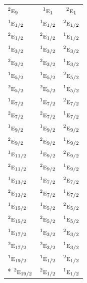 \documentclass[10pt,a4paper]{article}
\numberwithin{equation}{section}
\newcommand{\irr}[1]{\text{\normalfont\scshape #1}}
\newcommand{\conjpair}[1]{{}^{#1}}
\begin{document}
{\begin{longtable}{@{}lcc@{}}
$\conjpair{2}\irr{e}_{9}$ & $\conjpair{1}\irr{e}_{1}$ & $\conjpair{2}\irr{e}_{1}$\\
$\conjpair{1}\irr{e}_{1/2}$ & $\conjpair{1}\irr{e}_{1/2}$ & $\conjpair{2}\irr{e}_{1/2}$\\
$\conjpair{2}\irr{e}_{1/2}$ & $\conjpair{2}\irr{e}_{1/2}$ & $\conjpair{1}\irr{e}_{1/2}$\\
$\conjpair{1}\irr{e}_{3/2}$ & $\conjpair{1}\irr{e}_{3/2}$ & $\conjpair{2}\irr{e}_{3/2}$\\
$\conjpair{2}\irr{e}_{3/2}$ & $\conjpair{2}\irr{e}_{3/2}$ & $\conjpair{1}\irr{e}_{3/2}$\\
$\conjpair{1}\irr{e}_{5/2}$ & $\conjpair{1}\irr{e}_{5/2}$ & $\conjpair{2}\irr{e}_{5/2}$\\
$\conjpair{2}\irr{e}_{5/2}$ & $\conjpair{2}\irr{e}_{5/2}$ & $\conjpair{1}\irr{e}_{5/2}$\\
$\conjpair{1}\irr{e}_{7/2}$ & $\conjpair{1}\irr{e}_{7/2}$ & $\conjpair{2}\irr{e}_{7/2}$\\
$\conjpair{2}\irr{e}_{7/2}$ & $\conjpair{2}\irr{e}_{7/2}$ & $\conjpair{1}\irr{e}_{7/2}$\\
$\conjpair{1}\irr{e}_{9/2}$ & $\conjpair{1}\irr{e}_{9/2}$ & $\conjpair{2}\irr{e}_{9/2}$\\
$\conjpair{2}\irr{e}_{9/2}$ & $\conjpair{2}\irr{e}_{9/2}$ & $\conjpair{1}\irr{e}_{9/2}$\\
$\conjpair{1}\irr{e}_{11/2}$ & $\conjpair{1}\irr{e}_{9/2}$ & $\conjpair{2}\irr{e}_{9/2}$\\
$\conjpair{2}\irr{e}_{11/2}$ & $\conjpair{2}\irr{e}_{9/2}$ & $\conjpair{1}\irr{e}_{9/2}$\\
$\conjpair{1}\irr{e}_{13/2}$ & $\conjpair{1}\irr{e}_{7/2}$ & $\conjpair{2}\irr{e}_{7/2}$\\
$\conjpair{2}\irr{e}_{13/2}$ & $\conjpair{2}\irr{e}_{7/2}$ & $\conjpair{1}\irr{e}_{7/2}$\\
$\conjpair{1}\irr{e}_{15/2}$ & $\conjpair{1}\irr{e}_{5/2}$ & $\conjpair{2}\irr{e}_{5/2}$\\
$\conjpair{2}\irr{e}_{15/2}$ & $\conjpair{2}\irr{e}_{5/2}$ & $\conjpair{1}\irr{e}_{5/2}$\\
$\conjpair{1}\irr{e}_{17/2}$ & $\conjpair{1}\irr{e}_{3/2}$ & $\conjpair{2}\irr{e}_{3/2}$\\
$\conjpair{2}\irr{e}_{17/2}$ & $\conjpair{2}\irr{e}_{3/2}$ & $\conjpair{1}\irr{e}_{3/2}$\\
$\conjpair{1}\irr{e}_{19/2}$ & $\conjpair{1}\irr{e}_{1/2}$ & $\conjpair{2}\irr{e}_{1/2}$\\*
$\conjpair{2}\irr{e}_{19/2}$ & $\conjpair{2}\irr{e}_{1/2}$ & $\conjpair{1}\irr{e}_{1/2}$\\
\bottomrule\end{longtable}}
\end{document}
